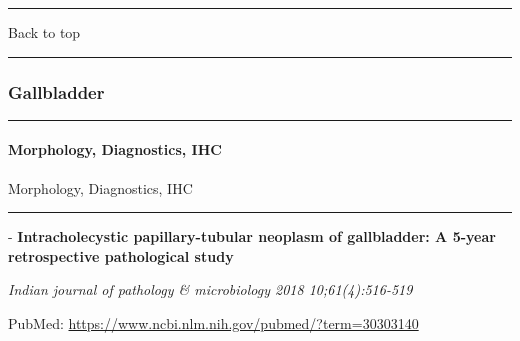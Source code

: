 \documentclass[]{article}
\let\oldparagraph\paragraph
\renewcommand{\paragraph}[1]{\oldparagraph{#1}\mbox{}}
\begin{document}
{}

{}

\begin{center}\rule{0.5\linewidth}{\linethickness}\end{center}

Back to top

\begin{center}\rule{0.5\linewidth}{\linethickness}\end{center}

\pagebreak

\hypertarget{gallbladder}{%
\subsubsection{Gallbladder}\label{gallbladder}}

\begin{center}\rule{0.5\linewidth}{\linethickness}\end{center}

\hypertarget{morphology-diagnostics-ihc-1}{%
\paragraph{Morphology, Diagnostics,
IHC}\label{morphology-diagnostics-ihc-1}}

Morphology, Diagnostics, IHC

\begin{center}\rule{0.5\linewidth}{\linethickness}\end{center}

 - \textbf{Intracholecystic papillary-tubular neoplasm of gallbladder: A
5-year retrospective pathological study}

\emph{Indian journal of pathology \& microbiology 2018 10;61(4):516-519}

PubMed: \url{https://www.ncbi.nlm.nih.gov/pubmed/?term=30303140}
\end{document}
